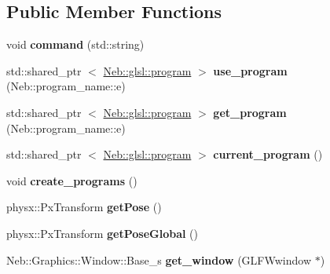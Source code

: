 \subsection*{\-Public \-Member \-Functions}
\begin{DoxyCompactItemize}
\item 
\hypertarget{classNeb_1_1App_1_1Base_add6e387b326940dc524ed6cd9d5d76db}{void {\bfseries command} (std\-::string)}\label{classNeb_1_1App_1_1Base_add6e387b326940dc524ed6cd9d5d76db}

\item 
\hypertarget{classNeb_1_1App_1_1Base_ad1b379ac9a17366de1f53859fdf56eff}{std\-::shared\-\_\-ptr\*
$<$ \hyperlink{classNeb_1_1glsl_1_1program}{\-Neb\-::glsl\-::program} $>$ {\bfseries use\-\_\-program} (\-Neb\-::program\-\_\-name\-::e)}\label{classNeb_1_1App_1_1Base_ad1b379ac9a17366de1f53859fdf56eff}

\item 
\hypertarget{classNeb_1_1App_1_1Base_a87ec2d1ee35f0a54746b445400d09da0}{std\-::shared\-\_\-ptr\*
$<$ \hyperlink{classNeb_1_1glsl_1_1program}{\-Neb\-::glsl\-::program} $>$ {\bfseries get\-\_\-program} (\-Neb\-::program\-\_\-name\-::e)}\label{classNeb_1_1App_1_1Base_a87ec2d1ee35f0a54746b445400d09da0}

\item 
\hypertarget{classNeb_1_1App_1_1Base_afb7f83fe4804b67c2ec09980f012bf24}{std\-::shared\-\_\-ptr\*
$<$ \hyperlink{classNeb_1_1glsl_1_1program}{\-Neb\-::glsl\-::program} $>$ {\bfseries current\-\_\-program} ()}\label{classNeb_1_1App_1_1Base_afb7f83fe4804b67c2ec09980f012bf24}

\item 
\hypertarget{classNeb_1_1App_1_1Base_a8aaee8b061c48ae6eeb997bf9393aa62}{void {\bfseries create\-\_\-programs} ()}\label{classNeb_1_1App_1_1Base_a8aaee8b061c48ae6eeb997bf9393aa62}

\item 
\hypertarget{classNeb_1_1App_1_1Base_a7cbbae817434580b497ace5b6afb6283}{physx\-::\-Px\-Transform {\bfseries get\-Pose} ()}\label{classNeb_1_1App_1_1Base_a7cbbae817434580b497ace5b6afb6283}

\item 
\hypertarget{classNeb_1_1App_1_1Base_a3cd18fcee50a8fb487155f7bb9822d97}{physx\-::\-Px\-Transform {\bfseries get\-Pose\-Global} ()}\label{classNeb_1_1App_1_1Base_a3cd18fcee50a8fb487155f7bb9822d97}

\item 
\hypertarget{classNeb_1_1App_1_1Base_a3c200a59a2141594b8ad6adcb6e8b7c9}{\-Neb\-::\-Graphics\-::\-Window\-::\-Base\-\_\-s {\bfseries get\-\_\-window} (\-G\-L\-F\-Wwindow $\ast$)}\label{classNeb_1_1App_1_1Base_a3c200a59a2141594b8ad6adcb6e8b7c9}


\end{DoxyCompactItemize}

